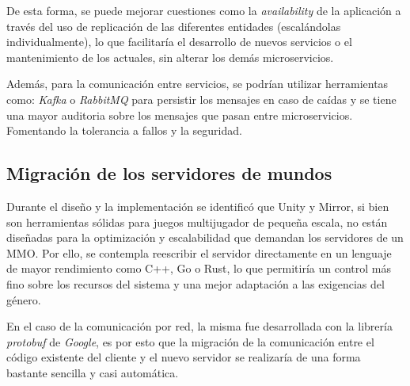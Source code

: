 \vspace{0.25cm}

De esta forma, se puede mejorar cuestiones como la \textit{availability} de la aplicación a través del uso de replicación
de las diferentes entidades (escalándolas individualmente), lo que facilitaría el desarrollo de nuevos servicios o el mantenimiento de los actuales, sin alterar 
los demás microservicios.

\vspace{0.25cm}

Además, para la comunicación entre servicios, se podrían utilizar herramientas
como: \textit{Kafka} o \textit{RabbitMQ} para persistir los mensajes en caso de caídas y se tiene una mayor auditoria 
sobre los mensajes que pasan entre microservicios. Fomentando la tolerancia a fallos y la seguridad.

\vspace{0.25cm}

\subsection{Migración de los servidores de mundos}
Durante el diseño y la implementación se identificó que Unity y Mirror, si bien son herramientas sólidas 
para juegos multijugador de pequeña escala, no están diseñadas para la optimización y escalabilidad que 
demandan los servidores de un MMO. Por ello, se contempla reescribir el servidor directamente en un 
lenguaje de mayor rendimiento como C++, Go o Rust, lo que permitiría un control más fino sobre los 
recursos del sistema y una mejor adaptación a las exigencias del género.
\vspace{0.25cm}

En el caso de la comunicación por red, la misma fue desarrollada con la librería \textit{protobuf} de \textit{Google}, 
es por esto que la migración de la comunicación entre el código existente del cliente y
el nuevo servidor se realizaría de una forma bastante sencilla y casi automática.

